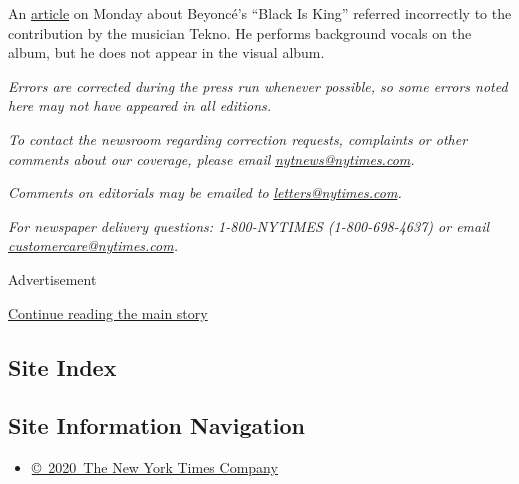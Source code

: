 An
\href{https://www.nytimes.com/2020/07/31/arts/music/beyonce-black-is-king.html}{article}
on Monday about Beyoncé's ``Black Is King'' referred incorrectly to the
contribution by the musician Tekno. He performs background vocals on the
album, but he does not appear in the visual album.

\emph{Errors are corrected during the press run whenever possible, so
some errors noted here may not have appeared in all editions.}

\emph{To contact the newsroom regarding correction requests, complaints
or other comments about our coverage, please email}
\href{mailto:nytnews@nytimes.com}{\emph{nytnews@nytimes.com}}\emph{.}

\emph{Comments on editorials may be emailed to}
\href{mailto:letters@nytimes.com}{\emph{letters@nytimes.com}}\emph{.}

\emph{For newspaper delivery questions: 1-800-NYTIMES (1-800-698-4637)
or email}
\href{mailto:customercare@nytimes.com}{\emph{customercare@nytimes.com}}\emph{.}

Advertisement

\protect\hyperlink{after-bottom}{Continue reading the main story}

\hypertarget{site-index}{%
\subsection{Site Index}\label{site-index}}

\hypertarget{site-information-navigation}{%
\subsection{Site Information
Navigation}\label{site-information-navigation}}

\begin{itemize}
\tightlist
\item
  \href{https://help.nytimes.com/hc/en-us/articles/115014792127-Copyright-notice}{©~2020~The
  New York Times Company}
\end{itemize}

